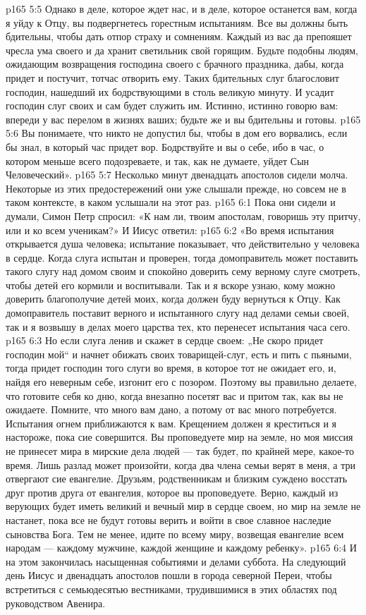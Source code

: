 \vs p165 5:5 Однако в деле, которое ждет нас, и в деле, которое останется вам, когда я уйду к Отцу, вы подвергнетесь горестным испытаниям. Все вы должны быть бдительны, чтобы дать отпор страху и сомнениям. Каждый из вас да препояшет чресла ума своего и да хранит светильник свой горящим. Будьте подобны людям, ожидающим возвращения господина своего с брачного праздника, дабы, когда придет и постучит, тотчас отворить ему. Таких бдительных слуг благословит господин, нашедший их бодрствующими в столь великую минуту. И усадит господин слуг своих и сам будет служить им. Истинно, истинно говорю вам: впереди у вас перелом в жизнях ваших; будьте же и вы бдительны и готовы.
\vs p165 5:6 Вы понимаете, что никто не допустил бы, чтобы в дом его ворвались, если бы знал, в который час придет вор. Бодрствуйте и вы о себе, ибо в час, о котором меньше всего подозреваете, и так, как не думаете, уйдет Сын Человеческий».
\vs p165 5:7 \pc Несколько минут двенадцать апостолов сидели молча. Некоторые из этих предостережений они уже слышали прежде, но совсем не в таком контексте, в каком услышали на этот раз.
\vs p165 6:1 Пока они сидели и думали, Симон Петр спросил: «К нам ли, твоим апостолам, говоришь эту притчу, или и ко всем ученикам?» И Иисус ответил:
\vs p165 6:2 \pc «Во время испытания открывается душа человека; испытание показывает, что действительно у человека в сердце. Когда слуга испытан и проверен, тогда домоправитель может поставить такого слугу над домом своим и спокойно доверить сему верному слуге смотреть, чтобы детей его кормили и воспитывали. Так и я вскоре узнаю, кому можно доверить благополучие детей моих, когда должен буду вернуться к Отцу. Как домоправитель поставит верного и испытанного слугу над делами семьи своей, так и я возвышу в делах моего царства тех, кто перенесет испытания часа сего.
\vs p165 6:3 Но если слуга ленив и скажет в сердце своем: „Не скоро придет господин мой“ и начнет обижать своих товарищей\hyp{}слуг, есть и пить с пьяными, тогда придет господин того слуги во время, в которое тот не ожидает его, и, найдя его неверным себе, изгонит его с позором. Поэтому вы правильно делаете, что готовите себя ко дню, когда внезапно посетят вас и притом так, как вы не ожидаете. Помните, что много вам дано, а потому от вас много потребуется. Испытания огнем приближаются к вам. Крещением должен я креститься и я настороже, пока сие совершится. Вы проповедуете мир на земле, но моя миссия не принесет мира в мирские дела людей --- так будет, по крайней мере, какое\hyp{}то время. Лишь разлад может произойти, когда два члена семьи верят в меня, а три отвергают сие евангелие. Друзьям, родственникам и близким суждено восстать друг против друга от евангелия, которое вы проповедуете. Верно, каждый из верующих будет иметь великий и вечный мир в сердце своем, но мир на земле не настанет, пока все не будут готовы верить и войти в свое славное наследие сыновства Бога. Тем не менее, идите по всему миру, возвещая евангелие всем народам --- каждому мужчине, каждой женщине и каждому ребенку».
\vs p165 6:4 \pc И на этом закончилась насыщенная событиями и делами суббота. На следующий день Иисус и двенадцать апостолов пошли в города северной Переи, чтобы встретиться с семьюдесятью вестниками, трудившимися в этих областях под руководством Авенира.
